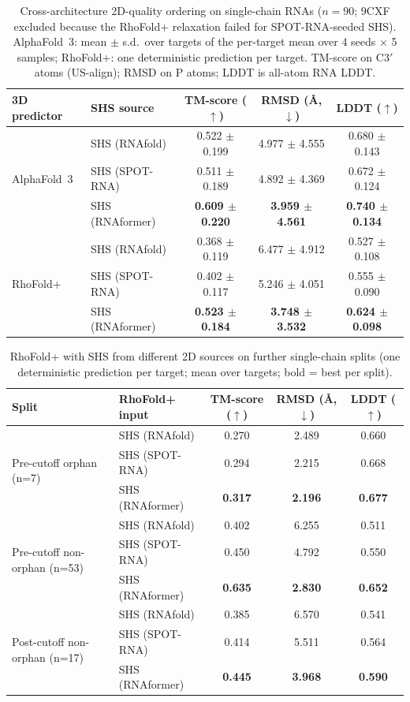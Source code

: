 \begin{table}[t]
\centering
\caption{Cross-architecture 2D-quality ordering on single-chain RNAs ($n{=}90$; 9CXF excluded because the RhoFold+ relaxation failed for SPOT-RNA-seeded SHS). AlphaFold~3: mean $\pm$ s.d.\ over targets of the per-target mean over 4 seeds $\times$ 5 samples; RhoFold+: one deterministic prediction per target. TM-score on C3$'$ atoms (US-align); RMSD on P atoms; LDDT is all-atom RNA LDDT.}
\label{tab:order_rna_single_chain}
\begin{tabular}{llccc}
\toprule
3D predictor & SHS source & TM-score ($\uparrow$) & RMSD (\AA, $\downarrow$) & LDDT ($\uparrow$) \\
\midrule
\multirow{3}{*}{AlphaFold~3} & SHS (RNAfold) & 0.522 $\pm$ 0.199 & 4.977 $\pm$ 4.555 & 0.680 $\pm$ 0.143 \\
 & SHS (SPOT-RNA) & 0.511 $\pm$ 0.189 & 4.892 $\pm$ 4.369 & 0.672 $\pm$ 0.124 \\
 & SHS (RNAformer) & \textbf{0.609 $\pm$ 0.220} & \textbf{3.959 $\pm$ 4.561} & \textbf{0.740 $\pm$ 0.134} \\
\midrule
\multirow{3}{*}{RhoFold+} & SHS (RNAfold) & 0.368 $\pm$ 0.119 & 6.477 $\pm$ 4.912 & 0.527 $\pm$ 0.108 \\
 & SHS (SPOT-RNA) & 0.402 $\pm$ 0.117 & 5.246 $\pm$ 4.051 & 0.555 $\pm$ 0.090 \\
 & SHS (RNAformer) & \textbf{0.523 $\pm$ 0.184} & \textbf{3.748 $\pm$ 3.532} & \textbf{0.624 $\pm$ 0.098} \\
\bottomrule
\end{tabular}
\end{table}

\begin{table}[t]
\centering
\caption{RhoFold+ with SHS from different 2D sources on further single-chain splits (one deterministic prediction per target; mean over targets; bold = best per split).}
\label{tab:rf_rna_single_chain_other_splits}
\begin{tabular}{llccc}
\toprule
Split & RhoFold+ input & TM-score ($\uparrow$) & RMSD (\AA, $\downarrow$) & LDDT ($\uparrow$) \\
\midrule
\multirow{3}{*}{Pre-cutoff orphan (n=7)} & SHS (RNAfold) & 0.270 & 2.489 & 0.660 \\
 & SHS (SPOT-RNA) & 0.294 & 2.215 & 0.668 \\
 & SHS (RNAformer) & \textbf{0.317} & \textbf{2.196} & \textbf{0.677} \\
\midrule
\multirow{3}{*}{Pre-cutoff non-orphan (n=53)} & SHS (RNAfold) & 0.402 & 6.255 & 0.511 \\
 & SHS (SPOT-RNA) & 0.450 & 4.792 & 0.550 \\
 & SHS (RNAformer) & \textbf{0.635} & \textbf{2.830} & \textbf{0.652} \\
\midrule
\multirow{3}{*}{Post-cutoff non-orphan (n=17)} & SHS (RNAfold) & 0.385 & 6.570 & 0.541 \\
 & SHS (SPOT-RNA) & 0.414 & 5.511 & 0.564 \\
 & SHS (RNAformer) & \textbf{0.445} & \textbf{3.968} & \textbf{0.590} \\
\bottomrule
\end{tabular}
\end{table}

